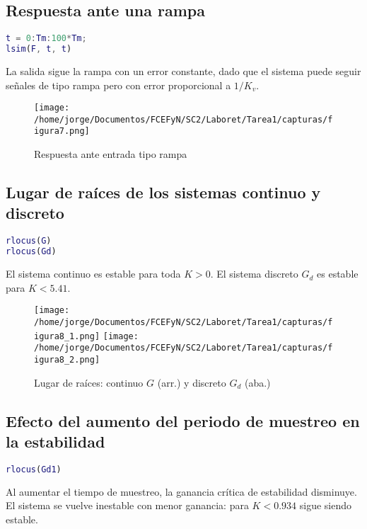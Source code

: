 \documentclass[11pt]{article}
\begin{document}
\subsection{Respuesta ante una rampa}
\begin{lstlisting}[language=Matlab]
t = 0:Tm:100*Tm;
lsim(F, t, t)
\end{lstlisting}

La salida sigue la rampa con un error constante, dado que el sistema puede seguir señales de tipo rampa pero con error proporcional a \(1/K_v\).

\begin{figure}[h!]
    \centering
    \texttt{[image: /home/jorge/Documentos/FCEFyN/SC2/Laboret/Tarea1/capturas/figura7.png]}
    \caption{Respuesta ante entrada tipo rampa}
\end{figure}

\newpage

\subsection{Lugar de raíces de los sistemas continuo y discreto}
\begin{lstlisting}[language=Matlab]
rlocus(G)
rlocus(Gd)
\end{lstlisting}

El sistema continuo es estable para toda \(K > 0\). El sistema discreto \(G_d\) es estable para \(K < 5.41\).

\begin{figure}[h!]
    \centering
    \texttt{[image: /home/jorge/Documentos/FCEFyN/SC2/Laboret/Tarea1/capturas/figura8\_1.png]}
    \texttt{[image: /home/jorge/Documentos/FCEFyN/SC2/Laboret/Tarea1/capturas/figura8\_2.png]}
    \caption{Lugar de raíces: continuo \(G\) (arr.) y discreto \(G_d\) (aba.)}
\end{figure}

\subsection{Efecto del aumento del periodo de muestreo en la estabilidad}
\begin{lstlisting}[language=Matlab]
rlocus(Gd1)
\end{lstlisting}

Al aumentar el tiempo de muestreo, la ganancia crítica de estabilidad disminuye. El sistema se vuelve inestable con menor ganancia: para \(K < 0.934\) sigue siendo estable.
\end{document}
